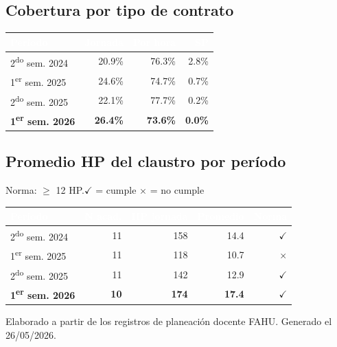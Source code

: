 \documentclass[11pt, a4paper]{article}
\begin{document}
\subsection{Cobertura por tipo de contrato}

\begin{tabular}{lrrr}
\toprule
\rowcolor{usachDark} \textbf{\textcolor{white}{Periodo}} & \textbf{\textcolor{white}{Jornada}} & \textbf{\textcolor{white}{Por hora}} & \textbf{\textcolor{white}{SP}} \\
\midrule
2\textsuperscript{do} sem. 2024 & 20.9\% & 76.3\% & 2.8\% \\
\rowcolor{rowEven}1\textsuperscript{er} sem. 2025 & 24.6\% & 74.7\% & 0.7\% \\
2\textsuperscript{do} sem. 2025 & 22.1\% & 77.7\% & 0.2\% \\
\rowcolor{rowHighlight}\textbf{1\textsuperscript{er} sem. 2026} & \textbf{26.4\%} & \textbf{73.6\%} & \textbf{0.0\%} \\
\bottomrule
\end{tabular}

\subsection{Promedio HP del claustro por período}

Norma: $\geq$ 12 HP.\quad$\checkmark$ = cumple \quad $\times$ = no cumple

\begin{tabular}{lrrrr}
\toprule
\rowcolor{usachDark} \textbf{\textcolor{white}{Periodo}} & \textbf{\textcolor{white}{N acad.}} & \textbf{\textcolor{white}{HP jornada}} & \textbf{\textcolor{white}{Promedio}} & \textbf{\textcolor{white}{Norma}} \\
\midrule
2\textsuperscript{do} sem. 2024 & 11 & 158 & 14.4 & $\checkmark$ \\
\rowcolor{rowEven}1\textsuperscript{er} sem. 2025 & 11 & 118 & 10.7 & $\times$ \\
2\textsuperscript{do} sem. 2025 & 11 & 142 & 12.9 & $\checkmark$ \\
\rowcolor{rowHighlight}\textbf{1\textsuperscript{er} sem. 2026} & \textbf{10} & \textbf{174} & \textbf{17.4} & \textbf{$\checkmark$} \\
\bottomrule
\end{tabular}

\vfill
{\footnotesize\color{gray} Elaborado a partir de los registros de planeación docente FAHU. Generado el 26/05/2026.}
\end{document}
